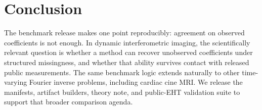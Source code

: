 \documentclass{article}
\begin{document}
\section{Conclusion}

The benchmark release makes one point reproducibly: agreement on observed coefficients is not enough. In dynamic interferometric imaging, the scientifically relevant question is whether a method can recover unobserved coefficients under structured missingness, and whether that ability survives contact with released public measurements. The same benchmark logic extends naturally to other time-varying Fourier inverse problems, including cardiac cine MRI. We release the manifests, artifact builders, theory note, and public-EHT validation suite to support that broader comparison agenda.



\end{document}
